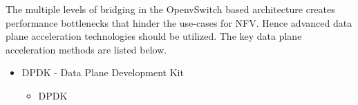 \documentclass[../seminar.tex]{subfiles}
\begin{document}
\begin{enumerate}
\begin{flushleft}
\begin{itemize}
\begin{flushleft}
The multiple levels of bridging in the OpenvSwitch based architecture creates performance bottlenecks that hinder the use-cases for NFV. Hence advanced data plane acceleration technologies should be utilized. The key data plane acceleration methods are listed below.
	
\begin{itemize}
\item DPDK - Data Plane Development Kit
\begin{itemize}
\item DPDK
\end{itemize}
\end{itemize} 
\end{flushleft}
				
\end{itemize}
\end{flushleft}
\end{enumerate}
	
	
\end{document}
